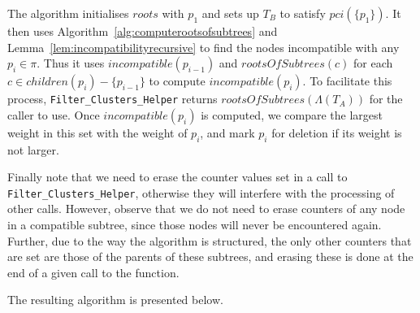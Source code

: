 \documentclass{article}
\newcommand{\leafset}{\Lambda}
\begin{document}
    The algorithm initialises $roots$ with $p_1$ and sets up $T_B$ to satisfy $pci(\{p_1\})$. It then uses Algorithm~\ref{alg:computerootsofsubtrees} and Lemma~\ref{lem:incompatibilityrecursive} to find the nodes incompatible with any $p_i \in \pi$. Thus it uses $incompatible(p_{i-1})$ and $rootsOfSubtrees(c)$ for each $c \in children(p_i) - \{p_{i-1}\}$ to compute $incompatible(p_i)$. To facilitate this process, \texttt{Filter\_Clusters\_Helper} returns $rootsOfSubtrees(\leafset(T_A))$ for the caller to use. Once $incompatible(p_i)$ is computed, we compare the largest weight in this set with the weight of $p_i$, and mark $p_i$ for deletion if its weight is not larger.

    Finally note that we need to erase the counter values set in a call to \texttt{Filter\_Clusters\_Helper}, otherwise they will interfere with the processing of other calls. However, observe that we do not need to erase counters of any node in a compatible subtree, since those nodes will never be encountered again. Further, due to the way the algorithm is structured, the only other counters that are set are those of the parents of these subtrees, and erasing these is done at the end of a given call to the function.

    The resulting algorithm is presented below.
\end{document}
